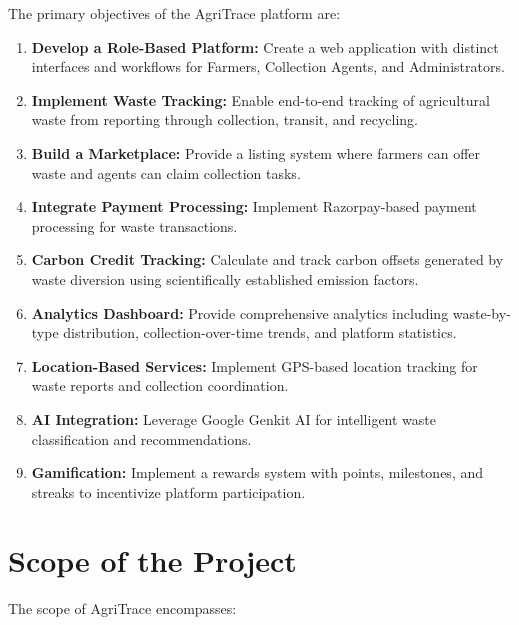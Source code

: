 \documentclass[a4paper,12pt,oneside]{report}
\let\originalitem\item
\renewcommand{\item}{\Needspace{10\baselineskip}\originalitem}
\begin{document}
\noindent The primary objectives of the AgriTrace platform are:

\begin{enumerate}
    \item \textbf{Develop a Role-Based Platform:} Create a web application with distinct interfaces and workflows for Farmers, Collection Agents, and Administrators.

    \item \textbf{Implement Waste Tracking:} Enable end-to-end tracking of agricultural waste from reporting through collection, transit, and recycling.

    \item \textbf{Build a Marketplace:} Provide a listing system where farmers can offer waste and agents can claim collection tasks.

    \item \textbf{Integrate Payment Processing:} Implement Razorpay-based payment processing for waste transactions.

    \item \textbf{Carbon Credit Tracking:} Calculate and track carbon offsets generated by waste diversion using scientifically established emission factors.

    \item \textbf{Analytics Dashboard:} Provide comprehensive analytics including waste-by-type distribution, collection-over-time trends, and platform statistics.

    \item \textbf{Location-Based Services:} Implement GPS-based location tracking for waste reports and collection coordination.

    \item \textbf{AI Integration:} Leverage Google Genkit AI for intelligent waste classification and recommendations.

    \item \textbf{Gamification:} Implement a rewards system with points, milestones, and streaks to incentivize platform participation.
\end{enumerate}

\newpage
\section{Scope of the Project}

\noindent The scope of AgriTrace encompasses:
\end{document}
